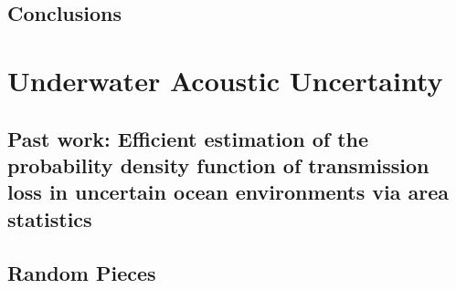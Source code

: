 \documentclass{./tex/thesis-umich}
\begin{document}
\acresetall

\chapter{Conclusions} \label{ch:usbe_conclusions}


\part{Underwater Acoustic Uncertainty} \label{part:uw_uncertainty}
\chapter{Past work: Efficient estimation of the probability density
  function of transmission loss in uncertain ocean environments via
  area statistics}
% 








\appendix
\begin{appendices}
  \chapter{Random Pieces}
  
  
  
  
  
  
  
  


\end{appendices}



%

\end{document}
